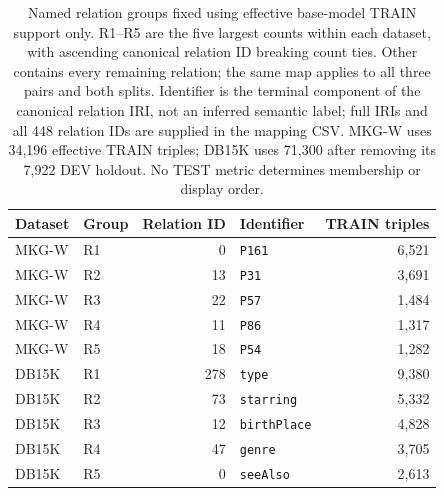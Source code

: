 \begin{table}[htbp]
\centering\footnotesize\setlength{\tabcolsep}{3pt}
\caption{Named relation groups fixed using effective base-model TRAIN support only. R1--R5 are the five largest counts within each dataset, with ascending canonical relation ID breaking count ties. Other contains every remaining relation; the same map applies to all three pairs and both splits. Identifier is the terminal component of the canonical relation IRI, not an inferred semantic label; full IRIs and all 448 relation IDs are supplied in the mapping CSV. MKG-W uses 34,196 effective TRAIN triples; DB15K uses 71,300 after removing its 7,922 DEV holdout. No TEST metric determines membership or display order.}
\label{tab:group-mapping}
\begin{tabular}{llrlr}
\toprule
Dataset & Group & Relation ID & Identifier & TRAIN triples\\
\midrule
MKG-W & R1 & 0 & \texttt{P161} & 6,521\\
MKG-W & R2 & 13 & \texttt{P31} & 3,691\\
MKG-W & R3 & 22 & \texttt{P57} & 1,484\\
MKG-W & R4 & 11 & \texttt{P86} & 1,317\\
MKG-W & R5 & 18 & \texttt{P54} & 1,282\\
DB15K & R1 & 278 & \texttt{type} & 9,380\\
DB15K & R2 & 73 & \texttt{starring} & 5,332\\
DB15K & R3 & 12 & \texttt{birthPlace} & 4,828\\
DB15K & R4 & 47 & \texttt{genre} & 3,705\\
DB15K & R5 & 0 & \texttt{seeAlso} & 2,613\\
\bottomrule
\end{tabular}
\end{table}
